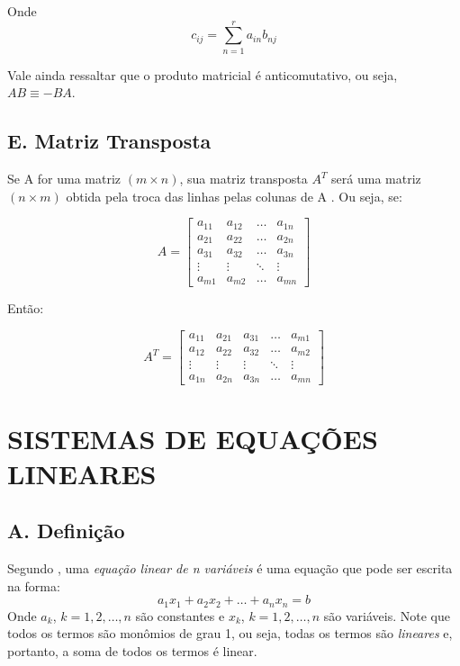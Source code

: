 \documentclass[twocolumn, 10pt]{extarticle}
\begin{document}
Onde \[c_{ij} = \sum_{n=1}^{r} a_{in}b_{nj}\]

Vale ainda ressaltar que o produto matricial é anticomutativo, ou seja, $AB \equiv -BA$.

\subsection*{E. \quad Matriz Transposta}

Se A for uma matriz $(m \times n)$, sua matriz transposta $A^T$ será uma matriz $(n \times m)$ obtida pela troca das linhas pelas colunas de A \cite[p. 34]{antonAlgebra}. Ou seja, se:

\[ 
A = 
\begin{bmatrix}
a_{11} & a_{12} & \dots & a_{1n} \\
a_{21} & a_{22} & \dots & a_{2n} \\
a_{31} & a_{32} & \dots & a_{3n} \\
\vdots & \vdots & \ddots & \vdots \\
a_{m1} & a_{m2} & \dots & a_{mn}  


\end{bmatrix}
\]

Então:

\[ 
A^T = 
\begin{bmatrix}
a_{11} & a_{21} & a_{31} & \dots & a_{m1} \\
a_{12} & a_{22} & a_{32} & \dots & a_{m2} \\
\vdots & \vdots & \vdots & \ddots & \vdots \\
a_{1n} & a_{2n} & a_{3n} & \dots & a_{mn} 

\end{bmatrix}
\]

\section{SISTEMAS DE EQUAÇÕES LINEARES}

\subsection*{A. \quad Definição}
Segundo \cite[p. 2]{antonAlgebra}, uma \textit{equação linear de n variáveis} é uma equação que pode ser escrita na forma:
\[
	a_1x_1 + a_2x_2 + \dots + a_nx_n = b
\]
Onde $a_k$, $k = 1, 2, \dots, n$ são constantes e $x_k$, $k = 1, 2, \dots, n$ são variáveis. Note que todos os termos são monômios de grau 1, ou seja, todas os termos são \textit{lineares} e, portanto, a soma de todos os termos é linear. 
\end{document}
